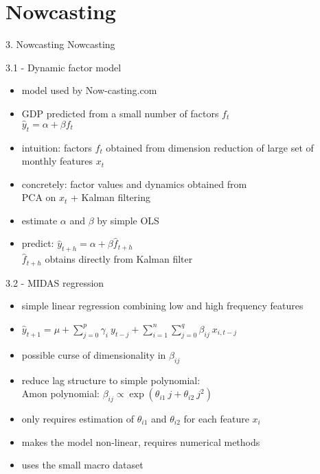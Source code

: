 \section{Nowcasting}

\begin{frame}{3. Nowcasting}
\centering
\Huge{Nowcasting}
\end{frame}

\begin{frame}{3.1 - Dynamic factor model}
	\begin{itemize}
		\item model used by Now-casting.com \\
		\item GDP predicted from a small number of factors $f_t$ \\
		$\hat{y}_t = \alpha + \beta {f_t}$
		\item intuition: factors $f_t$ obtained from dimension reduction of large set of monthly features $x_t$
		\item concretely: factor values and dynamics obtained from \\
		PCA on $x_t$ + Kalman filtering
		\item estimate $\alpha$ and $\beta$ by simple OLS
		\item predict: $\hat{y}_{t+h} = \alpha + \beta {\hat{f}_{t+h}}$ \\
		$\hat{f}_{t+h}$ obtains directly from Kalman filter
	\end{itemize}
\end{frame}

\begin{frame}{3.2 - MIDAS regression}
	\begin{itemize}
		\item simple linear regression combining low and high frequency features \vspace{1mm}
		\item $\hat{y}_{t+1} = \mu + \sum_{j=0}^{p} \gamma_i \ y_{t-j} + \sum_{i=1}^{n} \sum_{j=0}^{q} \beta_{ij} \  x_{i,t-j}$ \vspace{1mm}
		\item possible curse of dimensionality in $\beta_{ij}$ \vspace{1mm}
		\item reduce lag structure to simple polynomial: \\ \vspace{1mm}
		Amon polynomial: $\beta_{ij} \propto \exp(\theta_{i1} \ j + \theta_{i2} \ j^2)$ \vspace{1mm}
		\item only requires estimation of $\theta_{i1}$ and $\theta_{i2}$ for each feature $x_i$ \vspace{1mm}
		\item makes the model non-linear, requires numerical methods \vspace{1mm}
		\item uses the small macro dataset
	\end{itemize}
\end{frame}

